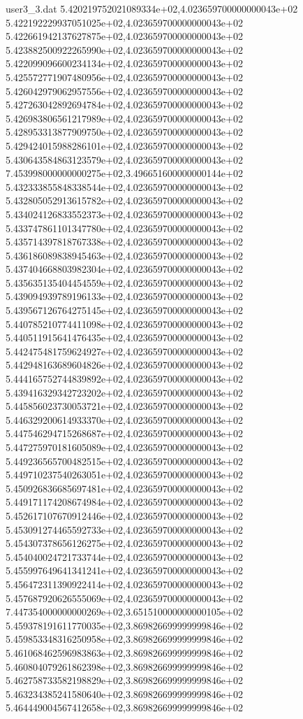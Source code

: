 \begin{filecontents}{user3_3.dat}
5.420219752021089334e+02,4.023659700000000043e+02
5.422192229937051025e+02,4.023659700000000043e+02
5.422661942137627875e+02,4.023659700000000043e+02
5.423882500922265990e+02,4.023659700000000043e+02
5.422099096600234134e+02,4.023659700000000043e+02
5.425572771907480956e+02,4.023659700000000043e+02
5.426042979062957556e+02,4.023659700000000043e+02
5.427263042892694784e+02,4.023659700000000043e+02
5.426983806561217989e+02,4.023659700000000043e+02
5.428953313877909750e+02,4.023659700000000043e+02
5.429424015988286101e+02,4.023659700000000043e+02
5.430643584863123579e+02,4.023659700000000043e+02
7.453998000000000275e+02,3.496651600000000144e+02
5.432333855848338544e+02,4.023659700000000043e+02
5.432805052913615782e+02,4.023659700000000043e+02
5.434024126833552373e+02,4.023659700000000043e+02
5.433747861101347780e+02,4.023659700000000043e+02
5.435714397818767338e+02,4.023659700000000043e+02
5.436186089838945463e+02,4.023659700000000043e+02
5.437404668803982304e+02,4.023659700000000043e+02
5.435635135404454559e+02,4.023659700000000043e+02
5.439094939789196133e+02,4.023659700000000043e+02
5.439567126764275145e+02,4.023659700000000043e+02
5.440785210774411098e+02,4.023659700000000043e+02
5.440511915641476435e+02,4.023659700000000043e+02
5.442475481759624927e+02,4.023659700000000043e+02
5.442948163689604826e+02,4.023659700000000043e+02
5.444165752744839892e+02,4.023659700000000043e+02
5.439416329342723202e+02,4.023659700000000043e+02
5.445856023730053721e+02,4.023659700000000043e+02
5.446329200614933370e+02,4.023659700000000043e+02
5.447546294715268687e+02,4.023659700000000043e+02
5.447275970181605089e+02,4.023659700000000043e+02
5.449236565700482515e+02,4.023659700000000043e+02
5.449710237540263051e+02,4.023659700000000043e+02
5.450926836685697481e+02,4.023659700000000043e+02
5.449171174208674984e+02,4.023659700000000043e+02
5.452617107670912446e+02,4.023659700000000043e+02
5.453091274465592733e+02,4.023659700000000043e+02
5.454307378656126275e+02,4.023659700000000043e+02
5.454040024721733744e+02,4.023659700000000043e+02
5.455997649641341241e+02,4.023659700000000043e+02
5.456472311390922414e+02,4.023659700000000043e+02
5.457687920626555069e+02,4.023659700000000043e+02
7.447354000000000269e+02,3.651510000000000105e+02
5.459378191611770035e+02,3.869826699999999846e+02
5.459853348316250958e+02,3.869826699999999846e+02
5.461068462596983863e+02,3.869826699999999846e+02
5.460804079261862398e+02,3.869826699999999846e+02
5.462758733582198829e+02,3.869826699999999846e+02
5.463234385241580640e+02,3.869826699999999846e+02
5.464449004567412658e+02,3.869826699999999846e+02

\end{filecontents}
